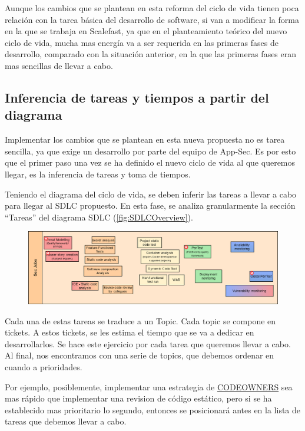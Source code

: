 \documentclass[12pt]{report} %
\begin{document}
Aunque los cambios que se plantean en esta reforma del ciclo de vida tienen poca
relación con la tarea básica del desarrollo de software, si van a modificar la
forma en la que se trabaja en Scalefast, ya que en el planteamiento teórico del
nuevo ciclo de vida, mucha mas energía va a ser requerida en las primeras fases
de desarrollo, comparado con la situación anterior, en la que las primeras fases
eran mas sencillas de llevar a cabo.

\subsection{Inferencia de tareas y tiempos a partir del diagrama}

Implementar los cambios que se plantean en esta nueva propuesta no es tarea
sencilla, ya que exige un desarrollo por parte del equipo de \gls{App-Sec}.
Es por esto que el primer paso una vez se ha definido el nuevo ciclo de vida al que
queremos llegar, es la inferencia de tareas y toma de tiempos.

Teniendo el diagrama del ciclo de vida, se deben inferir las tareas a llevar a
cabo para llegar al \gls{SDLC} propuesto.
En esta fase, se analiza granularmente la sección ``Tareas'' del diagrama
\gls{SDLC} (\ref{fig:SDLCOverview}).

\begin{figure}[H]
  \includegraphics[width=\textwidth]{SDLC-Sec-SecJobs.png} 
  \label{fig:SDLCOverview-jobs}
\end{figure}

Cada una de estas tareas se traduce a un Topic.
Cada topic se compone en tickets.
A estos tickets, se les estima el tiempo que se va a dedicar en desarrollarlos.
Se hace este ejercicio por cada tarea que queremos llevar a cabo.
Al final, nos encontramos con una serie de topics, que debemos ordenar en cuando
a prioridades.

Por ejemplo, posiblemente, implementar una estrategia de
\href{https://docs.gitlab.com/ee/user/project/code_owners.html}{CODEOWNERS}
sea mas rápido que implementar una revision de código estático, pero si se ha
establecido mas prioritario lo segundo, entonces se posicionará antes en la lista de
tareas que debemos llevar a cabo.
\end{document}
